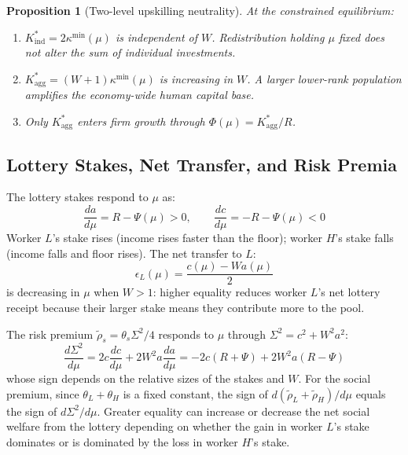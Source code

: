 \documentclass[12pt,a4paper]{article}
\newtheorem{proposition}{Proposition}
\begin{document}
\begin{proposition}[Two-level upskilling neutrality]
\label{prop:neutrality}
At the constrained equilibrium:
\begin{enumerate}
  \item $K^*_{\mathrm{ind}} = 2\kappa^{\min}(\mu)$ is independent of
        $W$. Redistribution holding $\mu$ fixed does not alter the sum
        of individual investments.
  \item $K^*_{\mathrm{agg}} = (W+1)\kappa^{\min}(\mu)$ is increasing
        in $W$. A larger lower-rank population amplifies the economy-wide
        human capital base.
  \item Only $K^*_{\mathrm{agg}}$ enters firm growth through
        $\Phi(\mu) = K^*_{\mathrm{agg}}/R$.
\end{enumerate}
\end{proposition}

\subsection{Lottery Stakes, Net Transfer, and Risk Premia}

The lottery stakes respond to $\mu$ as:
\begin{equation}
  \frac{da}{d\mu} = R - \Psi(\mu) > 0,
  \qquad
  \frac{dc}{d\mu} = -R - \Psi(\mu) < 0
  \label{eq:dstakes}
\end{equation}
Worker $L$'s stake rises (income rises faster than the floor);
worker $H$'s stake falls (income falls and floor rises). The net
transfer to $L$:
\begin{equation}
  \epsilon_L(\mu) = \frac{c(\mu) - Wa(\mu)}{2}
  \label{eq:transfer_mu}
\end{equation}
is decreasing in $\mu$ when $W > 1$: higher equality reduces worker
$L$'s net lottery receipt because their larger stake means they
contribute more to the pool.

The risk premium $\tilde\rho_s = \theta_s\Sigma^2/4$ responds to $\mu$
through $\Sigma^2 = c^2 + W^2a^2$:
\begin{equation}
  \frac{d\Sigma^2}{d\mu}
  = 2c\frac{dc}{d\mu} + 2W^2 a\frac{da}{d\mu}
  = -2c(R+\Psi) + 2W^2 a(R-\Psi)
  \label{eq:dSigma}
\end{equation}
whose sign depends on the relative sizes of the stakes and $W$. For
the social premium, since $\theta_L + \theta_H$ is a fixed constant,
the sign of $d(\tilde\rho_L+\tilde\rho_H)/d\mu$ equals the sign of
$d\Sigma^2/d\mu$. Greater equality can increase or decrease the net
social welfare from the lottery depending on whether the gain in
worker $L$'s stake dominates or is dominated by the loss in worker
$H$'s stake.
\end{document}
